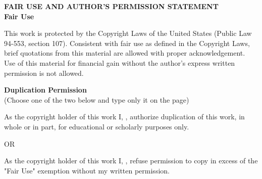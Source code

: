 \thispagestyle{empty}

\begin{center}
    \large
    \doublespacing
    \textbf{FAIR USE AND AUTHOR'S PERMISSION STATEMENT} \\
    \textbf{Fair Use}
\end{center}
\begin{flushleft}
    \singlespacing
    This work is protected by the Copyright Laws of the United States (Public Law 94-553,
    section 107). Consistent with fair use as defined in the Copyright Laws, brief quotations
    from this material are allowed with proper acknowledgement. Use of this material for
    financial gain without the author's express written permission is not allowed.
    \newline
    \newline
\end{flushleft}
\begin{center}
    \doublespacing
    \textbf{Duplication Permission} \\
    (Choose one of the two below and type only it on the page)
\end{center}
\begin{flushleft}
    \singlespacing
    As the copyright holder of this work I, \myName, authorize duplication of this
    work, in whole or in part, for educational or scholarly purposes only. \\
\end{flushleft}
\begin{center}
    OR \\
\end{center}
\begin{flushleft}
    \singlespacing
    As the copyright holder of this work I, \myName, refuse permission to copy in
    excess of the "Fair Use" exemption without my written permission.

    \vfill
\end{flushleft}
